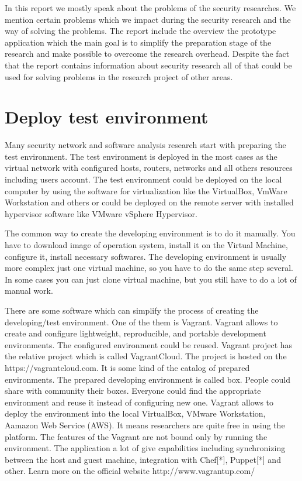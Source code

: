 \documentclass[twoside]{article}
\begin{document}
In this report we mostly speak about the problems of the security researches. We mention certain problems which we impact during the security research and the way of solving the problems. The report include the overview the prototype application which the main goal is to simplify the preparation stage of the research and make possible to overcome the research overhead. Despite the fact that the report contains information about security research all of that could be used for solving problems in the research project of other areas.      


\section{Deploy test environment}
Many security network and software analysis research start with preparing the test environment. The test environment is deployed in the most cases as the virtual network with configured hosts, routers, networks and all others resources including users account. The test environment could be deployed on the local computer by using the software for virtualization like the VirtualBox, VmWare Workstation and others or could be deployed on the remote server with installed hypervisor software like VMware vSphere Hypervisor.          

The common way to create the developing environment is to do it manually. You have to download image of operation system, install it on the Virtual Machine, configure it, install necessary softwares. The developing environment is usually more complex just one virtual machine, so you have to do the same step several. In some cases you can just clone virtual machine, but you still have to do a lot of manual work.       
  
There are some software which can simplify the process of creating the developing/test environment. One of the them is Vagrant. Vagrant allows to create and configure lightweight, reproducible, and portable development environments. The configured environment could be reused. Vagrant project has the relative project which is called VagrantCloud. The project is hosted on the https://vagrantcloud.com. It is some kind of the catalog of prepared environments. The prepared developing environment is called box.  People could share with community their boxes. Everyone could find the appropriate environment and reuse it instead of configuring new one. Vagrant allows to deploy the environment into the local VirtualBox, VMware Workstation, Aamazon Web Service (AWS). It means researchers are quite free in using the platform. The features of the Vagrant are not bound only by running the environment. The application a lot of give capabilities including synchronizing between the host and guest machine, integration with Chef[*], Puppet[*] and other. Learn more on the official website http://www.vagrantup.com/ 
\end{document}
